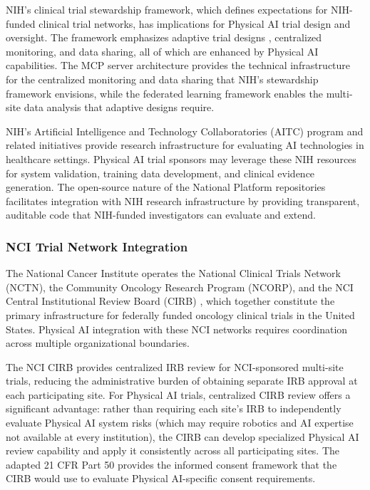 NIH's clinical trial stewardship framework, which defines expectations for
NIH-funded clinical trial networks, has implications for Physical AI trial
design and oversight. The framework emphasizes adaptive trial designs
\cite{fda-adaptive-designs}, centralized monitoring, and data sharing, all
of which are enhanced by Physical AI capabilities. The MCP server
architecture \cite{national-mcp-paper} provides the technical infrastructure
for the centralized monitoring and data sharing that NIH's stewardship
framework envisions, while the federated learning framework \cite{fl-paper}
enables the multi-site data analysis that adaptive designs require.

NIH's Artificial Intelligence and Technology Collaboratories (AITC) program
and related initiatives provide research infrastructure for evaluating AI
technologies in healthcare settings. Physical AI trial sponsors may leverage
these NIH resources for system validation, training data development, and
clinical evidence generation. The open-source nature of the National Platform
repositories \cite{main-repo, mcp-repo, fl-repo} facilitates integration
with NIH research infrastructure by providing transparent, auditable code
that NIH-funded investigators can evaluate and extend.

\subsubsection{NCI Trial Network Integration}

The National Cancer Institute operates the National Clinical Trials Network
(NCTN), the Community Oncology Research Program (NCORP), and the NCI Central
Institutional Review Board (CIRB) \cite{nci-cirb}, which together constitute
the primary infrastructure for federally funded oncology clinical trials in
the United States. Physical AI integration with these NCI networks requires
coordination across multiple organizational boundaries.

The NCI CIRB provides centralized IRB review for NCI-sponsored multi-site
trials, reducing the administrative burden of obtaining separate IRB approval
at each participating site. For Physical AI trials, centralized CIRB review
offers a significant advantage: rather than requiring each site's IRB to
independently evaluate Physical AI system risks (which may require robotics
and AI expertise not available at every institution), the CIRB can develop
specialized Physical AI review capability and apply it consistently across
all participating sites. The adapted 21 CFR Part 50 \cite{cfr50-adapt}
provides the informed consent framework that the CIRB would use to evaluate
Physical AI-specific consent requirements.

